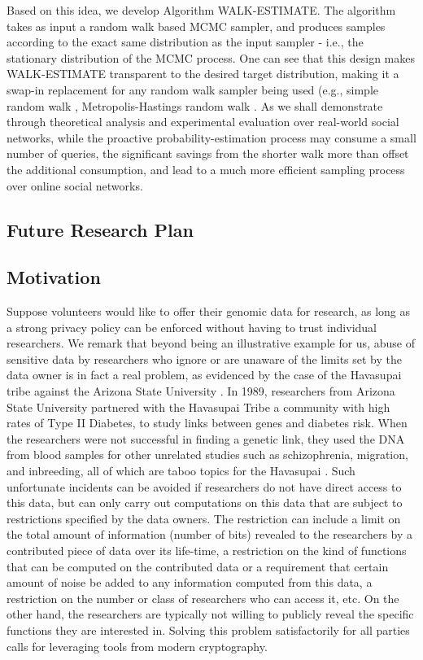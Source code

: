 \documentclass[letterpaper,12pt]{article}
\begin{document}
      Based on this idea, we develop Algorithm WALK-ESTIMATE. The algorithm takes as input a random walk based MCMC sampler, and produces samples according to the exact same distribution as the input sampler - i.e., the stationary distribution of the MCMC process. One can see that this design makes WALK-ESTIMATE transparent to the desired target distribution, making it a swap-in replacement for any random walk sampler being used (e.g., simple random walk \cite{Lovasz1993,Levin:2008}, Metropolis-Hastings random walk \cite{Lovasz1993,Levin:2008}.  As we shall demonstrate through theoretical analysis and experimental evaluation over real-world social networks, while the proactive probability-estimation process may consume a small number of queries, the significant savings from the shorter walk more than offset the additional consumption, and lead to a much more efficient sampling process over online social networks.


   \newpage
   \begin{singlespace}
   \section{Future Research Plan}
   \end{singlespace}
          \subsection{Motivation}

Suppose volunteers would like to offer their genomic data for research, as long as a strong privacy policy can be enforced without having to trust individual researchers. We remark that beyond being an illustrative example for us, abuse of sensitive data by researchers who ignore or are unaware of the limits set by the data owner is in fact a real problem, as evidenced by the case of the Havasupai tribe against the Arizona State University \cite{Tribe:Online,Havasupai:Online }. In 1989, researchers from Arizona State University partnered with the Havasupai Tribe a community with high rates of Type II Diabetes, to study links between genes and diabetes risk. When the researchers were not successful in finding a genetic link, they used the DNA from blood samples for other unrelated studies such as schizophrenia, migration, and inbreeding, all of which are taboo topics for the Havasupai \cite{Havasupai:Online}. Such unfortunate incidents can be avoided if researchers do not have direct access to this data, but can only carry out computations on this data that are subject to restrictions specified by the data owners. The restriction can include a limit on the total amount of information (number of bits) revealed to the researchers by a contributed piece of data over its life-time, a restriction on the kind of functions that can be computed on the contributed data or a requirement that certain amount of noise be added to any information computed from this data, a restriction on the number or class of researchers who can access it, etc. On the other hand, the researchers are typically not willing to publicly reveal the specific functions they are interested in. Solving this problem satisfactorily for all parties calls for leveraging tools from modern cryptography.
\end{document}
